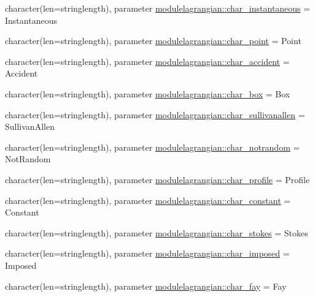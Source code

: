 \begin{DoxyCompactItemize}
\item 
character(len=stringlength), parameter \mbox{\hyperlink{namespacemodulelagrangian_a782c8241c87e133fded7322d77fb377d}{modulelagrangian\+::char\+\_\+instantaneous}} = \textquotesingle{}Instantaneous\textquotesingle{}
\item 
character(len=stringlength), parameter \mbox{\hyperlink{namespacemodulelagrangian_af51e42b2008c9fc0b7f0f8a67426fc1a}{modulelagrangian\+::char\+\_\+point}} = \textquotesingle{}Point\textquotesingle{}
\item 
character(len=stringlength), parameter \mbox{\hyperlink{namespacemodulelagrangian_a3d58992501b83300f17849535400cb30}{modulelagrangian\+::char\+\_\+accident}} = \textquotesingle{}Accident\textquotesingle{}
\item 
character(len=stringlength), parameter \mbox{\hyperlink{namespacemodulelagrangian_a1bb5489a623f3db3dadc2d102b0673de}{modulelagrangian\+::char\+\_\+box}} = \textquotesingle{}Box\textquotesingle{}
\item 
character(len=stringlength), parameter \mbox{\hyperlink{namespacemodulelagrangian_a77257dd5aad536351bc4ef938df9f980}{modulelagrangian\+::char\+\_\+sullivanallen}} = \textquotesingle{}Sullivan\+Allen\textquotesingle{}
\item 
character(len=stringlength), parameter \mbox{\hyperlink{namespacemodulelagrangian_a05bc616527a53da22640ad359bf08f95}{modulelagrangian\+::char\+\_\+notrandom}} = \textquotesingle{}Not\+Random\textquotesingle{}
\item 
character(len=stringlength), parameter \mbox{\hyperlink{namespacemodulelagrangian_adc8162fbfcd88a0eb8507640bfc80b38}{modulelagrangian\+::char\+\_\+profile}} = \textquotesingle{}Profile\textquotesingle{}
\item 
character(len=stringlength), parameter \mbox{\hyperlink{namespacemodulelagrangian_a1adf80ef146c2498b8c3480e13e589ab}{modulelagrangian\+::char\+\_\+constant}} = \textquotesingle{}Constant\textquotesingle{}
\item 
character(len=stringlength), parameter \mbox{\hyperlink{namespacemodulelagrangian_a6a2bc2e41e31821fe363572d1751cde9}{modulelagrangian\+::char\+\_\+stokes}} = \textquotesingle{}Stokes\textquotesingle{}
\item 
character(len=stringlength), parameter \mbox{\hyperlink{namespacemodulelagrangian_a29a86bbb42bd8a4d0a625014d74b5dde}{modulelagrangian\+::char\+\_\+imposed}} = \textquotesingle{}Imposed\textquotesingle{}
\item 
character(len=stringlength), parameter \mbox{\hyperlink{namespacemodulelagrangian_ada928bfd1aeffae2393b775351e8686a}{modulelagrangian\+::char\+\_\+fay}} = \textquotesingle{}Fay\textquotesingle{}

\end{DoxyCompactItemize}
